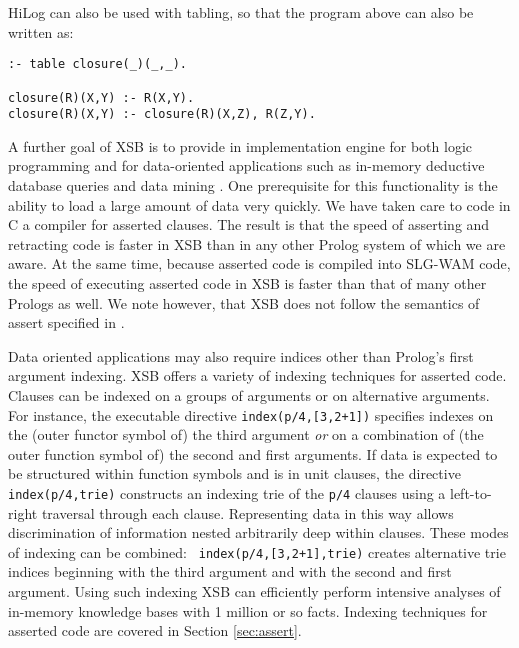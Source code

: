 HiLog can also be used with tabling, so that the program above can also be
written as:
\begin{center}
\begin{minipage}{3.7in}
\begin{verbatim}
:- table closure(_)(_,_).

closure(R)(X,Y) :- R(X,Y).
closure(R)(X,Y) :- closure(R)(X,Z), R(Z,Y).
\end{verbatim}
\end{minipage}
\end{center}

A further goal of XSB is to provide in implementation engine for both logic
programming and for data-oriented applications such as in-memory
deductive database queries and data mining \cite{SaSw94}.  One
prerequisite for this functionality is the ability to load a large
amount of data very quickly.  We have taken care to code in C a
compiler for asserted clauses.  The result is that the speed of
asserting and retracting code is faster in XSB than in any
other Prolog system of which we are aware.  At the same time, because
asserted code is compiled into SLG-WAM code, the speed of executing
asserted code in XSB is faster than that of many other Prologs as
well.  We note however, that XSB does not follow the semantics
of assert specified in \cite{LiOk87}.

Data oriented applications may also require indices other than
Prolog's first argument indexing.  XSB offers a variety of indexing
techniques for asserted code.  Clauses can be indexed on a groups of
arguments or on alternative arguments.  For instance, the executable
directive {\tt index(p/4,[3,2+1])} specifies indexes on the (outer
functor symbol of) the third argument {\em or} on a combination of (the
outer function symbol of) the second and first
arguments.  If data is expected to be structured within function
symbols and is in unit clauses, the directive {\tt index(p/4,trie)}
constructs an indexing trie of the {\tt p/4} clauses using a
left-to-right traversal through each clause.  Representing data in
this way allows discrimination of information nested arbitrarily deep
within clauses.  These modes of indexing can be combined: {\tt
index(p/4,[3,2+1],trie)} creates alternative trie indices beginning
with the third argument and with the second and first argument.  Using
such indexing XSB can efficiently perform intensive analyses of
in-memory knowledge bases with 1 million or so facts.  Indexing
techniques for asserted code are covered in Section
\ref{sec:assert}.

